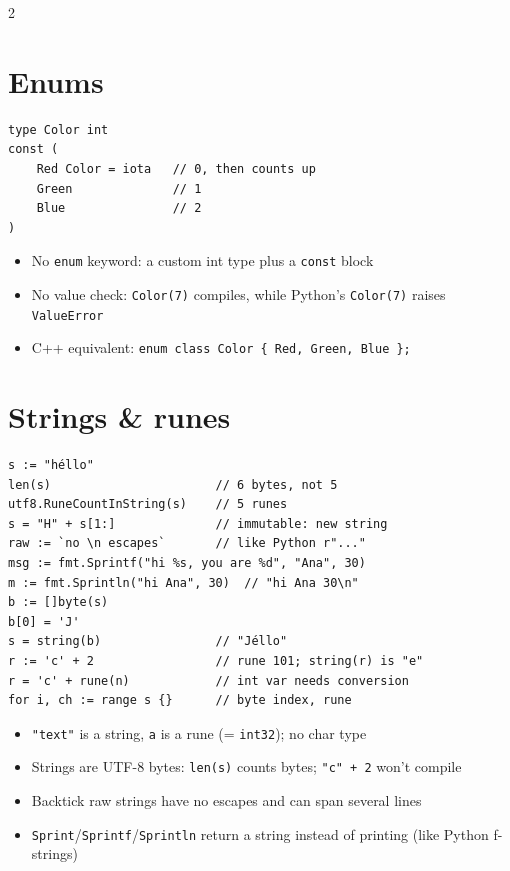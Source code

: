 \documentclass[9pt]{extarticle}
\newcommand{\kw}[1]{\textcolor{accent}{\texttt{#1}}}
\begin{document}
\begin{multicols*}{2}
\section{Enums}
\begin{lstlisting}
type Color int
const (
    Red Color = iota   // 0, then counts up
    Green              // 1
    Blue               // 2
)
\end{lstlisting}
\begin{itemize}
  \item No \kw{enum} keyword: a custom int type plus a \kw{const} block
  \item No value check: \kw{Color(7)} compiles, while Python's \kw{Color(7)} raises \kw{ValueError}
  \item C++ equivalent: \kw{enum class Color \{ Red, Green, Blue \};}
\end{itemize}

\section{Strings \& runes}
\begin{lstlisting}
s := "héllo"
len(s)                       // 6 bytes, not 5
utf8.RuneCountInString(s)    // 5 runes
s = "H" + s[1:]              // immutable: new string
raw := `no \n escapes`       // like Python r"..."
msg := fmt.Sprintf("hi %s, you are %d", "Ana", 30)
m := fmt.Sprintln("hi Ana", 30)  // "hi Ana 30\n"
b := []byte(s)
b[0] = 'J'
s = string(b)                // "Jéllo"
r := 'c' + 2                 // rune 101; string(r) is "e"
r = 'c' + rune(n)            // int var needs conversion
for i, ch := range s {}      // byte index, rune
\end{lstlisting}
\begin{itemize}
  \item \kw{"text"} is a string, \kw{\textquotesingle a\textquotesingle} is a rune (= \kw{int32}); no char type
  \item Strings are UTF-8 bytes: \kw{len(s)} counts bytes; \kw{"c" + 2} won't compile
  \item Backtick raw strings have no escapes and can span several lines
  \item \kw{Sprint}/\kw{Sprintf}/\kw{Sprintln} return a string instead of printing (like Python f-strings)
\end{itemize}


\end{multicols*}
\end{document}
